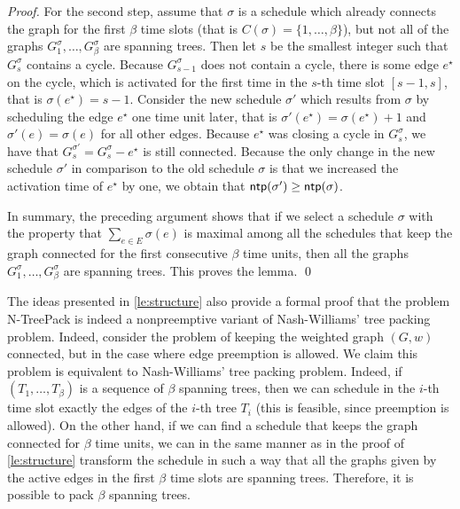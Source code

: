 \documentclass[runningheads]{llncs}
\newcommand{\set}[1]{\{ #1 \}}
\newcommand{\fromto}[2]{\set{#1, \ldots, #2}}
\newcommand{\xxxNTP}{{\sc N-TreePack}}
\DeclareMathOperator{\ntp}{\text{\sf ntp}}
\newcommand{\lasse}[1]{#1}
\begin{document}
\begin{proof}
\lasse{
For the second step, assume that $\sigma$ is a schedule which already connects the graph for the first $\beta$ time slots (that is $C(\sigma) = \fromto{1}{\beta}$), but not all of the graphs $G^\sigma_1,\dots,G^\sigma_\beta$ are spanning trees. 
Then let $s$ be the smallest integer such that $G^\sigma_s$ contains a cycle.
 Because $G^\sigma_{s-1}$ does not contain a cycle, there is some edge $e^\star$ on the cycle, which is activated for the first time in the $s$-th time slot $[s-1, s]$, that is $\sigma(e^\star) = s-1$. 
Consider the new schedule $\sigma'$ which results from $\sigma$ by scheduling the edge $e^\star$ one time unit later, that is $\sigma'(e^\star) = \sigma(e^\star) + 1$ and $\sigma'(e) = \sigma(e)$ for all other edges. 
Because $e^\star$ was closing a cycle in $G^\sigma_s$, we have that $G^{\sigma'}_s = G^\sigma_s - e^\star$ is still connected.
 Because the only change in the new schedule $\sigma'$ in comparison to the old schedule $\sigma$ is that we increased the activation time of $e^\star$ by one, we obtain that $\ntp(\sigma') \geq \ntp(\sigma)$.} 

\lasse{
In summary, the preceding argument shows that if we select a schedule $\sigma$ with the property that $\sum_{e \in E}\sigma(e)$ is maximal among all the schedules that keep the graph connected for the first consecutive $\beta$ time units, then all the graphs $G^\sigma_1,\dots,G^\sigma_\beta$ are spanning trees. This proves the lemma. \qed
}
\end{proof}

\lasse{The ideas presented in \cref{le:structure} also provide a formal proof that the problem {\xxxNTP} is indeed a nonpreemptive variant of Nash-Williams' tree packing problem. 
Indeed, consider the problem of keeping the weighted graph $(G, w)$ connected, but in the case where edge preemption is allowed. We claim this problem is equivalent to Nash-Williams' tree packing problem.
 Indeed, if $(T_1,\dots,T_\beta)$ is a sequence of $\beta$ spanning trees, then we can schedule in the $i$-th time slot exactly the edges of the $i$-th tree $T_i$ 
(this is feasible, since preemption is allowed). 
On the other hand, if we can find a schedule that keeps the graph connected for $\beta$ time units, we can in the same manner as in the proof of \cref{le:structure} transform the schedule in such a way that all the graphs given by the active edges in the first $\beta$ time slots are spanning trees. 
Therefore, it is possible to pack $\beta$ spanning trees.  }
\end{document}

